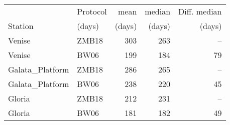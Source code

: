 \documentclass[preview]{standalone}
\begin{document}

\begin{tabular}{llrrr}
\hline
         & Protocol   &    mean &   median &   Diff. median \\
Station & (days)      & (days)  & (days)   & (days)    \\ 
\hline
Venise          & ZMB18      & 303 &    263   &           --   \\
Venise          & BW06       & 199 &    184   &          79   \\\hline
Galata\_Platform & ZMB18      & 286 &    265   &           --   \\
Galata\_Platform & BW06       & 238  &    220   &          45   \\\hline
Gloria          & ZMB18      & 212 &    231 &           --   \\
Gloria          & BW06       & 181 &    182   &          49 \\
\hline
\end{tabular}
\end{document}
